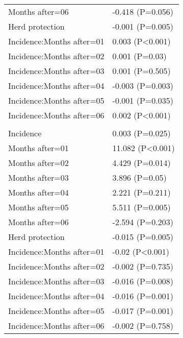 \documentclass[]{article}
\begin{document}
\begin{longtable}[t]{ll}
\hspace{1em}Months after=06 & -0.418 (P=0.056)\\
\hspace{1em}Herd protection & -0.001 (P=0.005)\\
\hspace{1em}Incidence:Months after=01 & 0.003 (P<0.001)\\
\hspace{1em}Incidence:Months after=02 & 0.001 (P=0.03)\\
\hspace{1em}Incidence:Months after=03 & 0.001 (P=0.505)\\
\hspace{1em}Incidence:Months after=04 & -0.003 (P=0.003)\\
\hspace{1em}Incidence:Months after=05 & -0.001 (P=0.035)\\
\hspace{1em}Incidence:Months after=06 & 0.002 (P<0.001)\\
\addlinespace[1.5em]
\multicolumn{2}{l}{\textbf{Temporary not field worker}}\\
\hspace{1em}Incidence & 0.003 (P=0.025)\\
\hspace{1em}Months after=01 & 11.082 (P<0.001)\\
\hspace{1em}Months after=02 & 4.429 (P=0.014)\\
\hspace{1em}Months after=03 & 3.896 (P=0.05)\\
\hspace{1em}Months after=04 & 2.221 (P=0.211)\\
\hspace{1em}Months after=05 & 5.511 (P=0.005)\\
\hspace{1em}Months after=06 & -2.594 (P=0.203)\\
\hspace{1em}Herd protection & -0.015 (P=0.005)\\
\hspace{1em}Incidence:Months after=01 & -0.02 (P<0.001)\\
\hspace{1em}Incidence:Months after=02 & -0.002 (P=0.735)\\
\hspace{1em}Incidence:Months after=03 & -0.016 (P=0.008)\\
\hspace{1em}Incidence:Months after=04 & -0.016 (P=0.001)\\
\hspace{1em}Incidence:Months after=05 & -0.017 (P=0.001)\\
\hspace{1em}Incidence:Months after=06 & -0.002 (P=0.758)\\*
\end{longtable}
\end{document}
